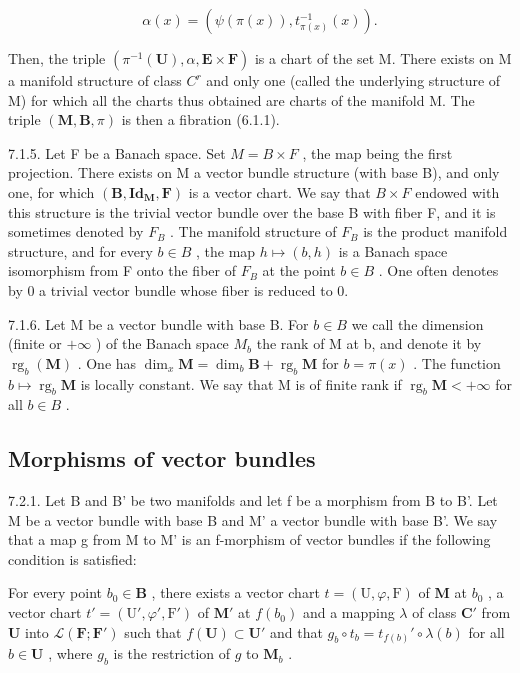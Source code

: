 \[
\alpha (x) = (\psi (\pi (x)), t _ {\pi (x)} ^ {- 1} (x)).
\]

Then, the triple \((\pi^{-1}(\mathbf{U}), \alpha, \mathbf{E} \times \mathbf{F})\) is a chart of the set M. There exists on M a manifold structure of class \(C^{r}\) and only one (called the underlying structure of M) for which all the charts thus obtained are charts of the manifold M. The triple \((\mathbf{M}, \mathbf{B}, \pi)\) is then a fibration (6.1.1).

7.1.5. Let F be a Banach space. Set \(M = B \times F\) , the map being the first projection. There exists on M a vector bundle structure (with base B), and only one, for which \((\mathbf{B}, \mathbf{Id}_{\mathbf{M}}, \mathbf{F})\) is a vector chart. We say that \(B \times F\) endowed with this structure is the trivial vector bundle over the base B with fiber F, and it is sometimes denoted by \(F_{B}\) . The manifold structure of \(F_{B}\) is the product manifold structure, and for every \(b \in B\) , the map \(h \mapsto (b, h)\) is a Banach space isomorphism from F onto the fiber of \(F_{B}\) at the point \(b \in B\) . One often denotes by 0 a trivial vector bundle whose fiber is reduced to 0.

7.1.6. Let M be a vector bundle with base B. For \(b \in B\) we call the dimension (finite or \(+\infty\) ) of the Banach space \(M_{b}\) the rank of M at b, and denote it by \(\operatorname{rg}_{b}(\mathbf{M})\) . One has \(\dim_{x}\mathbf{M} = \dim_{b}\mathbf{B} + \operatorname{rg}_{b}\mathbf{M}\) for \(b = \pi(x)\) . The function \(b \mapsto \operatorname{rg}_{b}\mathbf{M}\) is locally constant. We say that M is of finite rank if \(\operatorname{rg}_{b}\mathbf{M} < +\infty\) for all \(b \in B\) .

\subsection{Morphisms of vector bundles}

7.2.1. Let B and B' be two manifolds and let f be a morphism from B to B'. Let M be a vector bundle with base B and M' a vector bundle with base B'. We say that a map g from M to M' is an f-morphism of vector bundles if the following condition is satisfied:

For every point \(b_0 \in \mathbf{B}\) , there exists a vector chart \(t = (\mathrm{U}, \varphi, \mathrm{F})\) of \(\mathbf{M}\) at \(b_0\) , a vector chart \(t' = (\mathrm{U}', \varphi', \mathrm{F}')\) of \(\mathbf{M}'\) at \(f(b_0)\) and a mapping \(\lambda\) of class \(\mathbf{C}'\) from \(\mathbf{U}\) into \(\mathcal{L}(\mathbf{F}; \mathbf{F}')\) such that \(f(\mathbf{U}) \subset \mathbf{U}'\) and that \(g_b \circ t_b = t_{f(b)}' \circ \lambda(b)\) for all \(b \in \mathbf{U}\) , where \(g_b\) is the restriction of \(g\) to \(\mathbf{M}_b\) .

